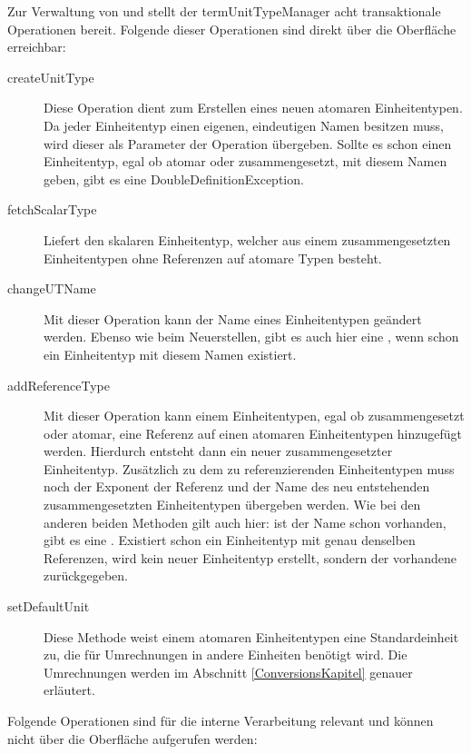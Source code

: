 Zur Verwaltung von  und  stellt der term{UnitTypeManager} acht transaktionale Operationen bereit. Folgende dieser Operationen sind direkt über die Oberfläche erreichbar:

\begin{description}
\item[createUnitType]
Diese Operation dient zum Erstellen eines neuen atomaren Einheitentypen. Da jeder Einheitentyp einen eigenen, eindeutigen Namen besitzen muss, wird dieser als Parameter der Operation übergeben. Sollte es schon einen Einheitentyp, egal ob atomar oder zusammengesetzt, mit diesem Namen geben, gibt es eine DoubleDefinitionException.
\item[fetchScalarType]
Liefert den skalaren Einheitentyp, welcher aus einem zusammengesetzten Einheitentypen ohne Referenzen auf atomare Typen besteht. 
\item[changeUTName]
Mit dieser Operation kann der Name eines Einheitentypen geändert werden. Ebenso wie beim Neuerstellen, gibt es auch hier eine , wenn schon ein Einheitentyp mit diesem Namen existiert.
\item[addReferenceType]
Mit dieser Operation kann einem Einheitentypen, egal ob zusammengesetzt oder atomar, eine Referenz auf einen atomaren Einheitentypen hinzugefügt werden. Hierdurch entsteht dann ein neuer zusammengesetzter Einheitentyp. Zusätzlich zu dem zu referenzierenden Einheitentypen muss noch der Exponent der Referenz und der Name des neu entstehenden zusammengesetzten Einheitentypen übergeben werden. Wie bei den anderen beiden Methoden gilt auch hier: ist der Name schon vorhanden, gibt es eine . Existiert schon ein Einheitentyp mit genau denselben Referenzen, wird kein neuer Einheitentyp erstellt, sondern der vorhandene zurückgegeben.
\item[setDefaultUnit]
Diese Methode weist einem atomaren Einheitentypen eine Standardeinheit zu, die für Umrechnungen in andere Einheiten benötigt wird. Die Umrechnungen werden im Abschnitt \ref{ConversionsKapitel} genauer erläutert.
\end{description}

Folgende Operationen sind für die interne Verarbeitung relevant und können nicht über die Oberfläche aufgerufen werden:

